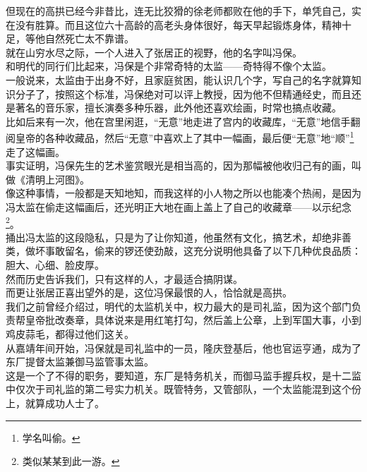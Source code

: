 \begin{multicols}{\theparacolNo}
但现在的高拱已经今非昔比，连无比狡猾的徐老师都败在他的手下，单凭自己，实在没有胜算。而且这位六十高龄的高老头身体很好，每天早起锻炼身体，精神十足，等他自然死亡太不靠谱。\\

就在山穷水尽之际，一个人进入了张居正的视野，他的名字叫冯保。\\

和明代的同行们比起来，冯保是个非常奇特的太监——奇特得不像个太监。\\

一般说来，太监由于出身不好，且家庭贫困，能认识几个字，写自己的名字就算知识分子了，按照这个标准，冯保绝对可以评上教授，因为他不但精通经史，而且还是著名的音乐家，擅长演奏多种乐器，此外他还喜欢绘画，时常也搞点收藏。\\

比如后来有一次，他在宫里闲逛，“无意”地走进了宫内的收藏库，“无意”地信手翻阅皇帝的各种收藏品，然后“无意”中喜欢上了其中一幅画，最后便“无意”地“顺”\footnote{学名叫偷。}走了这幅画。\\

事实证明，冯保先生的艺术鉴赏眼光是相当高的，因为那幅被他收归己有的画，叫做《清明上河图》。\\

像这种事情，一般都是天知地知，而我这样的小人物之所以也能凑个热闹，是因为冯太监在偷走这幅画后，还光明正大地在画上盖上了自己的收藏章——以示纪念\footnote{类似某某到此一游。}。\\

捅出冯太监的这段隐私，只是为了让你知道，他虽然有文化，搞艺术，却绝非善类，做坏事敢留名，偷来的锣还使劲敲，这充分说明他具备了以下几种优良品质：胆大、心细、脸皮厚。\\

然而历史告诉我们，只有这样的人，才最适合搞阴谋。\\

而更让张居正喜出望外的是，这位冯保最恨的人，恰恰就是高拱。\\

我们之前曾经介绍过，明代的太监机关中，权力最大的是司礼监，因为这个部门负责帮皇帝批改奏章，具体说来是用红笔打勾，然后盖上公章，上到军国大事，小到鸡皮蒜毛，都得过他们这关。\\

从嘉靖年间开始，冯保就是司礼监中的一员，隆庆登基后，他也官运亨通，成为了东厂提督太监兼御马监管事太监。\\

这是一个了不得的职务，要知道，东厂是特务机关，而御马监手握兵权，是十二监中仅次于司礼监的第二号实力机关。既管特务，又管部队，一个太监能混到这个份上，就算成功人士了。\\


\end{multicols}
